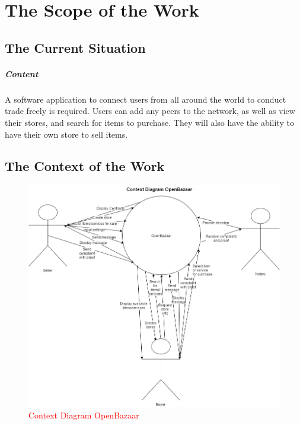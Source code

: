 \documentclass{article}
\begin{document}
\section{The Scope of the Work}
\subsection{The Current Situation}
\subparagraph{Content}
A software application to connect users from all around the world to conduct trade freely is required. Users can add any peers to the network, as well as view their stores, and search for items to purchase. They will also have the ability to have their own store to sell items.
\subsection{The Context of the Work}
\begin{figure}[H]
\includegraphics[scale=0.5]{ContextDiagramOpenBazaar}
\caption{\textcolor{red}{Context Diagram OpenBazaar}}
\end{figure}
\end{document}

